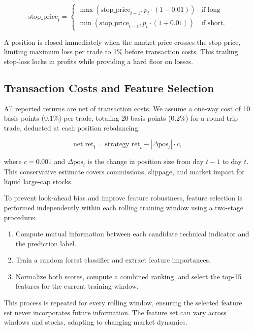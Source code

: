\documentclass[review]{elsarticle}
\begin{document}
\begin{equation}
\text{stop\_price}_t = 
\begin{cases}
\max(\text{stop\_price}_{t-1}, p_t \cdot (1 - 0.01)) & \text{if long} \\
\min(\text{stop\_price}_{t-1}, p_t \cdot (1 + 0.01)) & \text{if short}.
\end{cases}
\end{equation}

A position is closed immediately when the market price crosses the stop price, limiting maximum loss per trade to 1\% before transaction costs. This trailing stop-loss locks in profits while providing a hard floor on losses.

\subsection{Transaction Costs and Feature Selection}

All reported returns are net of transaction costs. We assume a one-way cost of 10 basis points (0.1\%) per trade, totaling 20 basis points (0.2\%) for a round-trip trade, deducted at each position rebalancing:

\begin{equation}
\text{net\_ret}_t = \text{strategy\_ret}_t - |\Delta \text{pos}_t| \cdot c,
\end{equation}

where $c = 0.001$ and $\Delta \text{pos}_t$ is the change in position size from day $t-1$ to day $t$. This conservative estimate covers commissions, slippage, and market impact for liquid large-cap stocks.

To prevent look-ahead bias and improve feature robustness, feature selection is performed independently within each rolling training window using a two-stage procedure:
\begin{enumerate}
\item Compute mutual information between each candidate technical indicator and the prediction label.
\item Train a random forest classifier and extract feature importances.
\item Normalize both scores, compute a combined ranking, and select the top-15 features for the current training window.
\end{enumerate}

This process is repeated for every rolling window, ensuring the selected feature set never incorporates future information. The feature set can vary across windows and stocks, adapting to changing market dynamics.
\end{document}
